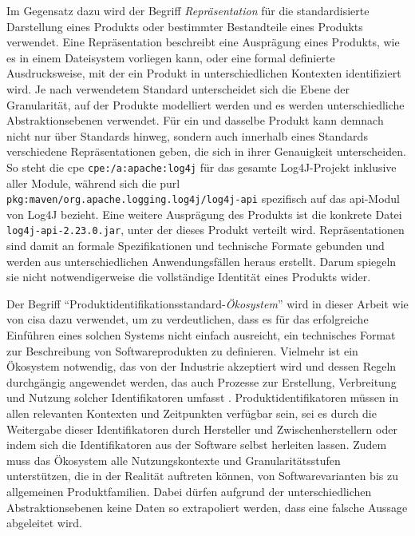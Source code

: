 Im Gegensatz dazu wird der Begriff \textit{Repräsentation} für die standardisierte Darstellung eines Produkts oder bestimmter Bestandteile eines Produkts verwendet.
Eine Repräsentation beschreibt eine Ausprägung eines Produkts, wie es in einem Dateisystem vorliegen kann, oder eine formal definierte Ausdrucksweise, mit der ein Produkt in unterschiedlichen Kontexten identifiziert wird.
Je nach verwendetem Standard unterscheidet sich die Ebene der Granularität, auf der Produkte modelliert werden und es werden unterschiedliche Abstraktionsebenen verwendet.
Für ein und dasselbe Produkt kann demnach nicht nur über Standards hinweg, sondern auch innerhalb eines Standards verschiedene Repräsentationen geben, die sich in ihrer Genauigkeit unterscheiden.
So steht die \acrshort{cpe} \texttt{cpe:/a:apache:log4j} für das gesamte Log4J-Projekt inklusive aller Module, während sich die \acrshort{purl} \texttt{pkg:maven/org.apache.logging.log4j/log4j-api} spezifisch auf das \acrshort{api}-Modul von Log4J bezieht.
Eine weitere Ausprägung des Produkts ist die konkrete Datei \texttt{log4j-api-2.23.0.jar}, unter der dieses Produkt verteilt wird.
Repräsentationen sind damit an formale Spezifikationen und technische Formate gebunden und werden aus unterschiedlichen Anwendungsfällen heraus erstellt.
Darum spiegeln sie nicht notwendigerweise die vollständige Identität eines Produkts wider.

Der Begriff \enquote{Produktidentifikationsstandard-\textit{Ökosystem}} wird in dieser Arbeit wie von \acrshort{cisa} dazu verwendet, um zu verdeutlichen, dass es für das erfolgreiche Einführen eines solchen Systems nicht einfach ausreicht, ein technisches Format zur Beschreibung von Softwareprodukten zu definieren.
Vielmehr ist ein Ökosystem notwendig, das von der Industrie akzeptiert wird und dessen Regeln durchgängig angewendet werden, das auch Prozesse zur Erstellung, Verbreitung und Nutzung solcher Identifikatoren umfasst \autocite{CISA2023}.
Produktidentifikatoren müssen in allen relevanten Kontexten und Zeitpunkten verfügbar sein, sei es durch die Weitergabe dieser Identifikatoren durch Hersteller und Zwischenherstellern oder indem sich die Identifikatoren aus der Software selbst herleiten lassen.
Zudem muss das Ökosystem alle Nutzungskontexte und Granularitätsstufen unterstützen, die in der Realität auftreten können, von Softwarevarianten bis zu allgemeinen Produktfamilien.
Dabei dürfen aufgrund der unterschiedlichen Abstraktionsebenen keine Daten so extrapoliert werden, dass eine falsche Aussage abgeleitet wird.

